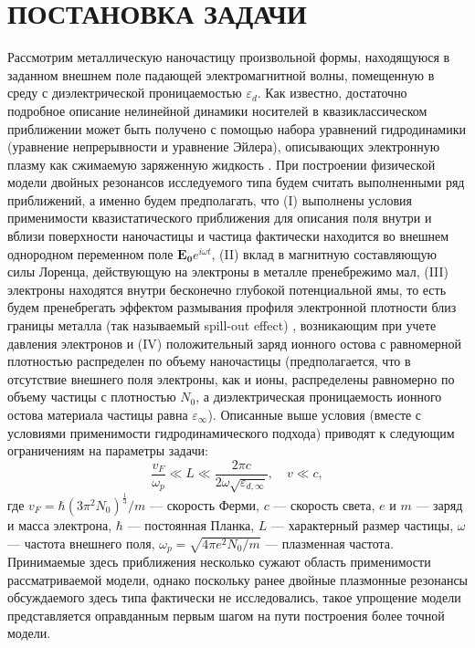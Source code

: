 \documentclass[12pt, a4paper]{article}
\renewcommand{\vec}{\mathbf}
\def \eps {\varepsilon}
\def \w {\omega}
\begin{document}
\section{ПОСТАНОВКА ЗАДАЧИ}

{Рассмотрим металлическую наночастицу }произвольной формы, находящуюся в заданном внешнем поле падающей электромагнитной волны, 
помещенную в среду с диэлектрической проницаемостью $\eps_d$. Как известно, достаточно подробное описание нелинейной динамики носителей в квазиклассическом приближении может быть получено с помощью набора уравнений гидродинамики (уравнение непрерывности и уравнение Эйлера), описывающих электронную плазму как сжимаемую заряженную жидкость  %
\cite{Boardman1982, Forstmann1986,Sipe1980,David2011}. 
При построении физической модели двойных резонансов исследуемого типа будем считать выполненными ряд приближений, а именно будем предполагать, что (I) 
выполнены условия применимости
квазистатического приближения для описания поля внутри и вблизи поверхности наночастицы и частица фактически находится во внешнем однородном переменном поле $\vec{E_0}e^{i\w t}$, (II) вклад в магнитную составляющую силы Лоренца, действующую на электроны в металле пренебрежимо мал, (III) электроны находятся внутри бесконечно глубокой потенциальной ямы, то есть будем пренебрегать эффектом размывания профиля электронной плотности близ границы металла (так называемый spill-out effect) \cite{Takeuchi2022,Jin2015,Zhou2021}, возникающим при учете давления электронов и (IV) положительный заряд ионного остова с равномерной плотностью распределен по объему наночастицы (предполагается, что в отсутствие внешнего поля электроны, как и ионы, распределены равномерно по объему частицы с плотностью $N_0$, а диэлектрическая проницаемость ионного остова материала частицы равна $\eps_\infty$). Описанные выше условия (вместе с условиями применимости гидродинамического подхода) приводят к следующим ограничениям на параметры задачи: 
\begin{equation} 	
\frac{v_F}{\omega_p} \ll L \ll \frac{2\pi c}{2\omega\sqrt{\eps_{d, \infty}}},  \quad v \ll c, 
\end{equation} 
где $v_F = \hbar (3 \pi^2 N_0)^\frac{1}{3}/m $ — скорость Ферми, $c$ — скорость света, $e$ и $m$ — заряд и масса электрона, $\hbar$ — постоянная Планка, $L$ — характерный размер частицы, $\w$ — частота внешнего поля, $ \w_p = 
\sqrt{4 \pi e^2 N_0 / m}$  — плазменная частота. Принимаемые здесь приближения несколько сужают область применимости рассматриваемой модели, однако поскольку ранее двойные плазмонные резонансы обсуждаемого здесь типа фактически не исследовались, такое упрощение модели представляется оправданным первым шагом на пути построения более точной модели. 
\end{document}

